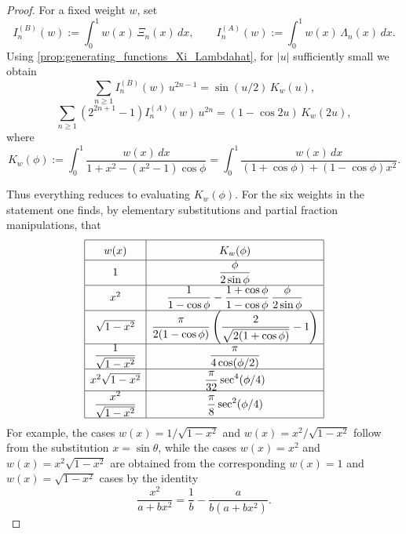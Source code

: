 \documentclass[11pt,twoside]{article}
\numberwithin{equation}{section}
\begin{document}
\begin{proof}
For a fixed weight \(w\), set
\[
I_n^{(B)}(w):=\int_0^1 w(x)\,\Xi_n(x)\,dx,
\qquad
I_n^{(A)}(w):=\int_0^1 w(x)\,\Lambda_n(x)\,dx.
\]
Using \cref{prop:generating_functions_Xi_Lambdahat}, for \(|u|\) sufficiently small we obtain
\[
\sum_{n\ge1} I_n^{(B)}(w)\,u^{2n-1}
=
\sin(u/2)\,K_w(u),
\]
\[
\sum_{n\ge1}(2^{2n+1}-1)I_n^{(A)}(w)\,u^{2n}
=
(1-\cos 2u)\,K_w(2u),
\]
where
\[
K_w(\phi):=
\int_0^1 \frac{w(x)\,dx}{1+x^2-(x^2-1)\cos\phi}
=
\int_0^1 \frac{w(x)\,dx}{(1+\cos\phi)+(1-\cos\phi)x^2}.
\]

Thus everything reduces to evaluating \(K_w(\phi)\). For the six weights in the statement one finds, by elementary substitutions and partial fraction manipulations, that
\[
\renewcommand{\arraystretch}{1.5}
\begin{array}{|c|c|}
\hline
w(x) & K_w(\phi) \\ \hline
1
&
\displaystyle \frac{\phi}{2\sin\phi}
\\ \hline
x^2
&
\displaystyle
\frac{1}{1-\cos\phi}
-
\frac{1+\cos\phi}{1-\cos\phi}\,\frac{\phi}{2\sin\phi}
\\ \hline
\sqrt{1-x^2}
&
\displaystyle
\frac{\pi}{2(1-\cos\phi)}
\left(\frac{2}{\sqrt{2(1+\cos\phi)}}-1\right)
\\ \hline
\displaystyle \frac{1}{\sqrt{1-x^2}}
&
\displaystyle \frac{\pi}{4\cos(\phi/2)}
\\ \hline
x^2\sqrt{1-x^2}
&
\displaystyle \frac{\pi}{32}\sec^4(\phi/4)
\\ \hline
\displaystyle \frac{x^2}{\sqrt{1-x^2}}
&
\displaystyle \frac{\pi}{8}\sec^2(\phi/4)
\\ \hline
\end{array}
\]
For example, the cases \(w(x)=1/\sqrt{1-x^2}\) and \(w(x)=x^2/\sqrt{1-x^2}\) follow from the substitution \(x=\sin\theta\), while the cases \(w(x)=x^2\) and \(w(x)=x^2\sqrt{1-x^2}\) are obtained from the corresponding \(w(x)=1\) and \(w(x)=\sqrt{1-x^2}\) cases by the identity
\[
\frac{x^2}{a+bx^2}=\frac1b-\frac{a}{b(a+bx^2)}.
\]


\end{proof}
\end{document}

